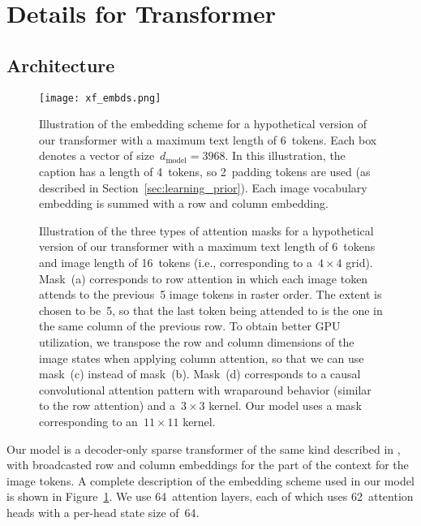 \documentclass{article}
\begin{document}
\section{Details for Transformer}

\subsection{Architecture}
\label{sec:xf_arch}
\begin{figure}[t]
    \centering
    \texttt{[image: xf\_embds.png]}
    \caption{Illustration of the embedding scheme for a hypothetical version of our transformer with a maximum text length of 6~tokens. Each box denotes a vector of size~$d_\mathrm{model} = 3968$. In this illustration, the caption has a length of 4~tokens, so 2~padding tokens are used (as described in Section~\ref{sec:learning_prior}). Each image vocabulary embedding is summed with a row and column embedding.}
    \label{fig:xf_embds}
\end{figure}
\begin{figure}[t]
    \centering
    \hspace{2mm}\hspace{2mm}\hspace{2mm}\caption{Illustration of the three types of attention masks for a hypothetical version of our transformer with a maximum text length of 6~tokens and image length of 16~tokens (i.e., corresponding to a~$4 \times 4$ grid). Mask~(a) corresponds to row attention in which each image token attends to the previous~5 image tokens in raster order. The extent is chosen to be~5, so that the last token being attended to is the one in the same column of the previous row. To obtain better GPU utilization, we transpose the row and column dimensions of the image states when applying column attention, so that we can use mask~(c) instead of mask~(b). Mask~(d) corresponds to a causal convolutional attention pattern with wraparound behavior (similar to the row attention) and a~$3 \times 3$ kernel. Our model uses a mask corresponding to an~$11 \times 11$ kernel.}
    \label{fig:xf_attn}
\end{figure}
Our model is a decoder-only sparse transformer of the same kind described in \citet{child2019generating}, with broadcasted row and column embeddings for the part of the context for the image tokens. A complete description of the embedding scheme used in our model is shown in Figure~\ref{fig:xf_embds}. We use 64~attention layers, each of which uses 62~attention heads with a per-head state size of~64.
\end{document}
